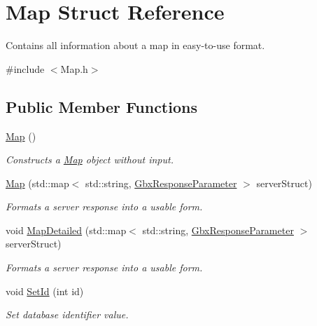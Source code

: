 \hypertarget{structMap}{\section{Map Struct Reference}
\label{structMap}
}


Contains all information about a map in easy-\/to-\/use format.  




{\ttfamily \#include $<$Map.\-h$>$}

\subsection*{Public Member Functions}
\begin{DoxyCompactItemize}
\item 
\hypertarget{structMap_a0f5ad0fd4563497b4214038cbca8b582}{\hyperlink{structMap_a0f5ad0fd4563497b4214038cbca8b582}{Map} ()}\label{structMap_a0f5ad0fd4563497b4214038cbca8b582}

\begin{DoxyCompactList}\small\item\em Constructs a \hyperlink{structMap}{Map} object without input. \end{DoxyCompactList}\item 
\hyperlink{structMap_a95a2cda9b2746b5ba75e811930559c1f}{Map} (std\-::map$<$ std\-::string, \hyperlink{classGbxResponseParameter}{Gbx\-Response\-Parameter} $>$ server\-Struct)
\begin{DoxyCompactList}\small\item\em Formats a server response into a usable form. \end{DoxyCompactList}\item 
void \hyperlink{structMap_ac8e78e5d9ba3951db798736fc33e907e}{Map\-Detailed} (std\-::map$<$ std\-::string, \hyperlink{classGbxResponseParameter}{Gbx\-Response\-Parameter} $>$ server\-Struct)
\begin{DoxyCompactList}\small\item\em Formats a server response into a usable form. \end{DoxyCompactList}\item 
void \hyperlink{structMap_af83b3a784e6fa9404c1940a2ca1b68a8}{Set\-Id} (int id)
\begin{DoxyCompactList}\small\item\em Set database identifier value. \end{DoxyCompactList}\end{DoxyCompactItemize}
